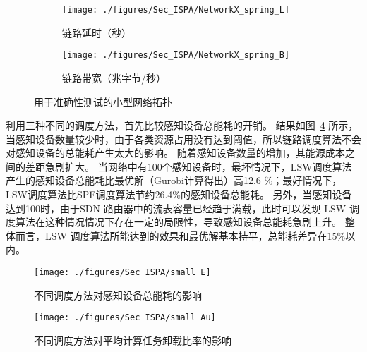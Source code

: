 \begin{figure}[!h]
  \centering
  \begin{subfigure}[b]{0.45\linewidth}
    \texttt{[image: ./figures/Sec\_ISPA/NetworkX\_spring\_L]}
    \label{fig_smallNetworkL}
    \caption{链路延时（秒）}
  \end{subfigure} %
  \begin{subfigure}[b]{0.45\linewidth}    
    \texttt{[image: ./figures/Sec\_ISPA/NetworkX\_spring\_B]}
    \label{fig_smallNetworkB}
    \caption{链路带宽（兆字节/秒）}
  \end{subfigure} 
  \caption{用于准确性测试的小型网络拓扑}
  \label{fig_smallNetwork}
\end{figure}

利用三种不同的调度方法，首先比较感知设备总能耗的开销。
结果如图~\ref{fig_smallE} 所示，当感知设备数量较少时，由于各类资源占用没有达到阈值，所以链路调度算法不会对感知设备的总能耗产生太大的影响。
随着感知设备数量的增加，其能源成本之间的差距急剧扩大。
当网络中有100个感知设备时，最坏情况下，LSW调度算法产生的感知设备总能耗比最优解（Gurobi计算得出）高12.6 \%；最好情况下，LSW调度算法比SPF调度算法节约26.4\%的感知设备总能耗。
另外，当感知设备达到100时，由于SDN 路由器中的流表容量已经趋于满载，此时可以发现 LSW 调度算法在这种情况情况下存在一定的局限性，导致感知设备总能耗急剧上升。
整体而言，LSW 调度算法所能达到的效果和最优解基本持平，总能耗差异在15\%以内。

\begin{figure}[!t]
  \centering
  \texttt{[image: ./figures/Sec\_ISPA/small\_E]}
  \vspace{-1em}
  \caption{不同调度方法对感知设备总能耗的影响}
  \label{fig_smallE}
\end{figure}


\begin{figure}[!h]
  \centering
  \texttt{[image: ./figures/Sec\_ISPA/small\_Au]}
  \vspace{-0.5em}
  \caption{不同调度方法对平均计算任务卸载比率的影响}
  \vspace{-0.5em}
  \label{fig_smallAu}
\end{figure}


